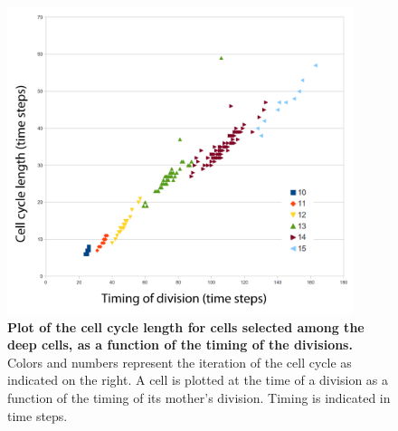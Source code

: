 \begin{figure}
\begin{center}
\includegraphics[width=0.9\textwidth]{../../images/Cases_Studies/Case_1_Division/071222bF_t_selection_1_all_T_121224_cellcyclelength_per_generation.png}
\end{center}
\caption{\textbf{Plot of the cell cycle length for cells selected among the deep cells, as a function of the timing of the divisions.} Colors and numbers represent the iteration of the cell cycle as indicated on the right. A cell is plotted at the time of a division as a function of the timing of its mother's division. Timing is indicated in time steps.}
\label{Case_1_Division_071222bF_t_selection_1_all_T_121224_cellcyclelength_per_generation}
\end{figure}


